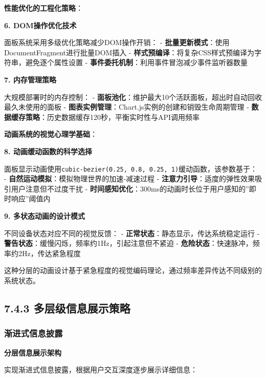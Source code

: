 \textbf{性能优化的工程化策略}：

\textbf{6. DOM操作优化技术}

面板系统采用多级优化策略减少DOM操作开销： - \textbf{批量更新模式}：使用DocumentFragment进行批量DOM插入 - \textbf{样式预编译}：将复杂CSS样式预编译为字符串，避免逐个属性设置 - \textbf{事件委托机制}：利用事件冒泡减少事件监听器数量

\textbf{7. 内存管理策略}

大规模部署时的内存控制： - \textbf{面板池化}：维护最大10个活跃面板，超出时自动回收最久未使用的面板 - \textbf{图表实例管理}：Chart.js实例的创建和销毁生命周期管理 - \textbf{数据缓存策略}：历史数据缓存120秒，平衡实时性与API调用频率

\textbf{动画系统的视觉心理学基础}：

\textbf{8. 动画缓动函数的科学选择}

面板显示动画使用\texttt{cubic-bezier(0.25,\ 0.8,\ 0.25,\ 1)}缓动函数，该参数基于： - \textbf{自然运动模拟}：模拟物理世界的加速-减速过程 - \textbf{注意力引导}：适度的弹性效果吸引用户注意但不过度干扰 - \textbf{时间感知优化}：300ms的动画时长位于用户感知的''即时响应''阈值内

\textbf{9. 多状态动画的设计模式}

不同设备状态对应不同的视觉反馈： - \textbf{正常状态}：静态显示，传达系统稳定运行 - \textbf{警告状态}：缓慢闪烁，频率约1Hz，引起注意但不紧迫 - \textbf{危险状态}：快速脉冲，频率约2Hz，传达紧急程度

这种分层的动画设计基于紧急程度的视觉编码理论，通过频率差异传达不同级别的系统状态。

\subsection{7.4.3 多层级信息展示策略}\label{ux591aux5c42ux7ea7ux4fe1ux606fux5c55ux793aux7b56ux7565}

\subsubsection{渐进式信息披露}\label{ux6e10ux8fdbux5f0fux4fe1ux606fux62abux9732}

\textbf{分层信息展示架构}

实现渐进式信息披露，根据用户交互深度逐步展示详细信息：

